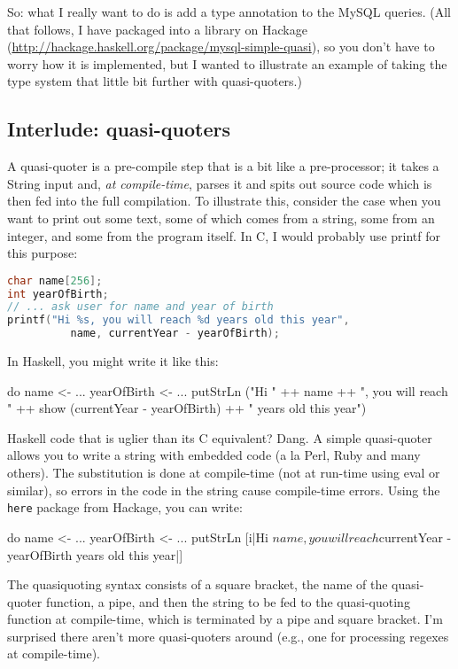 \documentclass{tmr}
\begin{document}
So: what I really want to do is add a type annotation to the MySQL queries.  (All that follows, I have packaged into a library on Hackage (\url{http://hackage.haskell.org/package/mysql-simple-quasi}), so you don't have to worry how it is implemented, but I wanted to illustrate an example of taking the type system that little bit further with quasi-quoters.)

\subsection{Interlude: quasi-quoters}

A quasi-quoter is a pre-compile step that is a bit like a pre-processor; it takes a String input and, \textit{at compile-time}, parses it and spits out source code which is then fed into the full compilation.  To illustrate this, consider the case when you want to print out some text, some of which comes from a string, some from an integer, and some from the program itself.  In C, I would probably use printf for this purpose:

\begin{lstlisting}[language=C]
char name[256];
int yearOfBirth;
// ... ask user for name and year of birth
printf("Hi %s, you will reach %d years old this year",
          name, currentYear - yearOfBirth);
\end{lstlisting}

In Haskell, you might write it like this:

\begin{code}
do name <- ...
   yearOfBirth <- ...
   putStrLn ("Hi " ++ name ++ ", you will reach " ++
     show (currentYear - yearOfBirth) ++ " years old this year")
\end{code}

Haskell code that is uglier than its C equivalent?  Dang.  A simple quasi-quoter allows you to write a string with embedded code (a la Perl, Ruby and many others).  The substitution is done at compile-time (not at run-time using eval or similar), so errors in the code in the string cause compile-time errors.  Using the \texttt{here} package from Hackage, you can write:

\begin{code}
do name <- ...
   yearOfBirth <- ...
   putStrLn [i|Hi ${name}, you will reach ${currentYear - yearOfBirth}
     years old this year|]
\end{code}

The quasiquoting syntax consists of a square bracket, the name of the quasi-quoter function, a pipe, and then the string to be fed to the quasi-quoting function at compile-time, which is terminated by a pipe and square bracket.  I'm surprised there aren't more quasi-quoters around (e.g., one for processing regexes at compile-time). 
\end{document}
